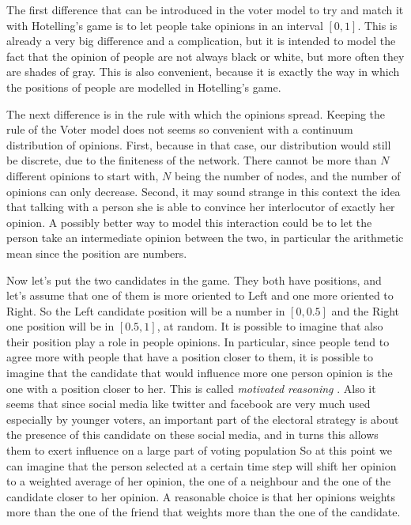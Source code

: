 \documentclass[11pt,a4paper,twocolumn]{article}
\begin{document}
The first difference that can be introduced in the voter model to try and match it with Hotelling's game is to let people take opinions in an interval $[0,1]$. This is already a very big difference and a complication, but it is intended to model the fact that the opinion of people are not always black or white, but more often they are shades of gray. This is also convenient, because it is exactly the way in which the positions of people are modelled in Hotelling's game.

The next difference is in the rule with which the opinions spread. Keeping the rule of the Voter model does not seems so convenient with a continuum distribution of opinions. First, because in that case, our distribution would still be discrete, due to the finiteness of the network. There cannot be more than $N$ different opinions to start with, $N$ being the number of nodes, and the number of opinions can only decrease. Second, it may sound strange in this context the idea that talking with a person she is able to convince her interlocutor of exactly her opinion. A possibly better way to model this interaction could be to let the person take an intermediate opinion between the two, in particular the arithmetic mean since the position are numbers.

Now let's put the two candidates in the game. They both have positions, and let's assume that one of them is more oriented to Left and one more oriented to Right. So the Left candidate position will be a number in $[0,0.5]$ and the Right one position will be in $[0.5,1]$, at random. 
It is possible to imagine that also their position play a role in people opinions. In particular, since people tend to agree more with people that have a position closer to them, it is possible to imagine that the candidate that would influence more one person opinion is the one with a position closer to her. This is called \emph{motivated reasoning} \cite{motherjones,kunda}. 
Also it seems that since social media like twitter and facebook are very much used especially by younger voters, an important part of the electoral strategy is about the presence of this candidate on these social media, and in turns this allows them to exert influence on a large part of voting population \cite{guardian,quartz,independent}
So at this point we can imagine that the person selected at a certain time step will shift her opinion to a weighted average of her opinion, the one of a neighbour and the one of the candidate closer to her opinion. A reasonable choice is that her opinions weights more than the one of the friend that weights more than the one of the candidate.
\end{document}
